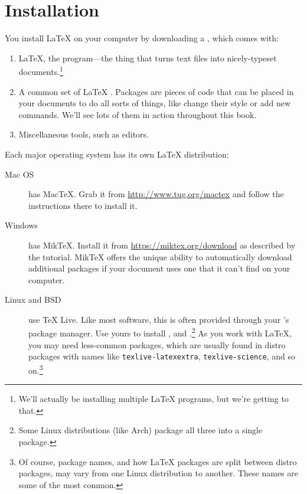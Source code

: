 \chapter{Installation}
\label{installation}

You install \LaTeX{} on your computer by downloading a ,
which comes with:
\begin{enumerate}
\item \LaTeX, the program---the thing that turns text files into nicely-typeset
    documents.\footnote{We'll actually be installing multiple \LaTeX{} programs,
    but we're getting to that.}
\item A common set of \LaTeX{} .
    Packages are pieces of code that can be placed in your documents to
    do all sorts of things, like change their style or add new commands.
    We'll see lots of them in action throughout this book.
\item Miscellaneous tools, such as editors.
\end{enumerate}
Each major operating system has its own \LaTeX{} distribution:
\begin{description}
\item[Mac OS] has Mac\TeX. Grab it from \url{http://www.tug.org/mactex}
    and follow the instructions there to install it.

\item[Windows] has Mik\TeX.
    Install it from \url{https://miktex.org/download}
    as described by the tutorial.
    Mik\TeX{} offers the unique ability to automatically download
    additional packages if your document uses one that it can't find
    on your computer.

\item[Linux and BSD] use \TeX{} Live.
    Like most software, this is often provided through your
    's package manager.
    Use yours to install ,
     and .\punckern\footnote{%
    Some Linux distributions (like Arch) package all three into a
    single  package.}
    As you work with \LaTeX, you may need less-common packages,
    which are usually found in distro packages with names like
    \texttt{texlive-latexextra}, \texttt{texlive-science},
    and so on.\punckern\footnote{Of
    course, package names, and how \LaTeX{} packages are split between
    distro packages, may vary from one Linux distribution to another.
    These names are some of the most common.}
\end{description}


